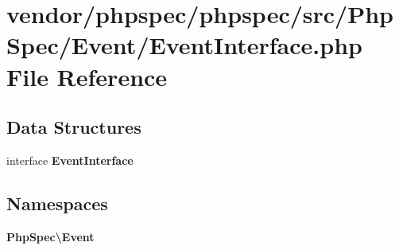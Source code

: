 \section{vendor/phpspec/phpspec/src/\+Php\+Spec/\+Event/\+Event\+Interface.php File Reference}
\label{_event_interface_8php}
\subsection*{Data Structures}
\begin{DoxyCompactItemize}
\item 
interface {\bf Event\+Interface}
\end{DoxyCompactItemize}
\subsection*{Namespaces}
\begin{DoxyCompactItemize}
\item 
 {\bf Php\+Spec\textbackslash{}\+Event}
\end{DoxyCompactItemize}

